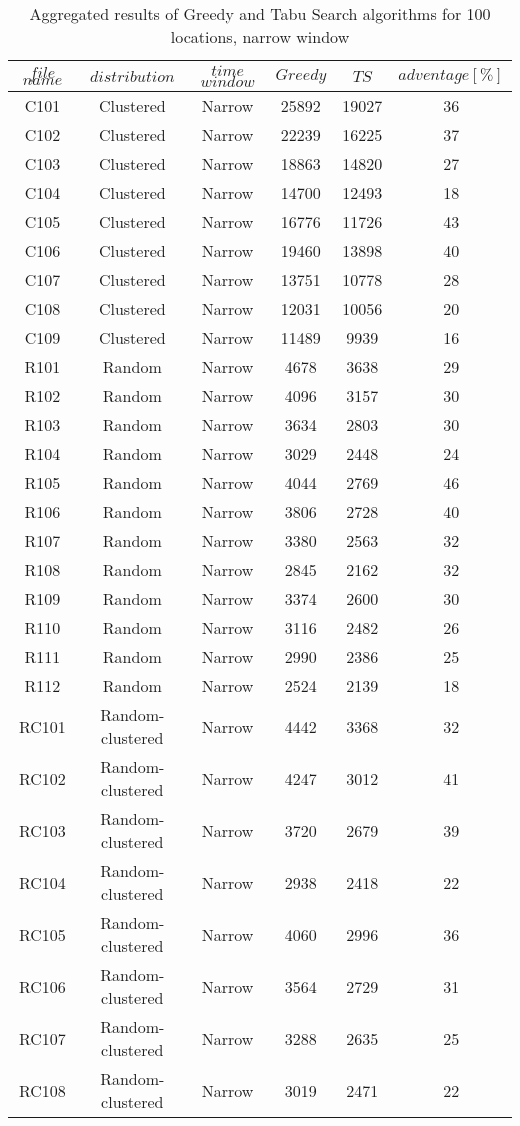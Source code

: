 \begin{table}[t]
\centering
\caption{
Aggregated results of Greedy and Tabu Search algorithms for 100 locations, narrow window}
\begin{tabular*}{0.8\linewidth}{@{\extracolsep{\fill}}cccccc}
\toprule
$file$ $name$ & $distribution$ & $time$ $window$ & $Greedy$ & $TS$ & $adventage[\%]$ \\ \midrule
C101 & Clustered & Narrow & 25892 & 19027 & 36\\
C102 & Clustered & Narrow & 22239 & 16225 & 37\\
C103 & Clustered & Narrow & 18863 & 14820 & 27\\
C104 & Clustered & Narrow & 14700 & 12493 & 18\\
C105 & Clustered & Narrow & 16776 & 11726 & 43\\
C106 & Clustered & Narrow & 19460 & 13898 & 40\\
C107 & Clustered & Narrow & 13751 & 10778 & 28\\
C108 & Clustered & Narrow & 12031 & 10056 & 20\\
C109 & Clustered & Narrow & 11489 & 9939 & 16\\
R101 & Random & Narrow & 4678 & 3638 & 29\\
R102 & Random & Narrow & 4096 & 3157 & 30\\
R103 & Random & Narrow & 3634 & 2803 & 30\\
R104 & Random & Narrow & 3029 & 2448 & 24\\
R105 & Random & Narrow & 4044 & 2769 & 46\\
R106 & Random & Narrow & 3806 & 2728 & 40\\
R107 & Random & Narrow & 3380 & 2563 & 32\\
R108 & Random & Narrow & 2845 & 2162 & 32\\
R109 & Random & Narrow & 3374 & 2600 & 30\\
R110 & Random & Narrow & 3116 & 2482 & 26\\
R111 & Random & Narrow & 2990 & 2386 & 25\\
R112 & Random & Narrow & 2524 & 2139 & 18\\
RC101 & Random-clustered & Narrow & 4442 & 3368 & 32\\
RC102 & Random-clustered & Narrow & 4247 & 3012 & 41\\
RC103 & Random-clustered & Narrow & 3720 & 2679 & 39\\
RC104 & Random-clustered & Narrow & 2938 & 2418 & 22\\
RC105 & Random-clustered & Narrow & 4060 & 2996 & 36\\
RC106 & Random-clustered & Narrow & 3564 & 2729 & 31\\
RC107 & Random-clustered & Narrow & 3288 & 2635 & 25\\
RC108 & Random-clustered & Narrow & 3019 & 2471 & 22\\
\end{tabular*}\end{table}
